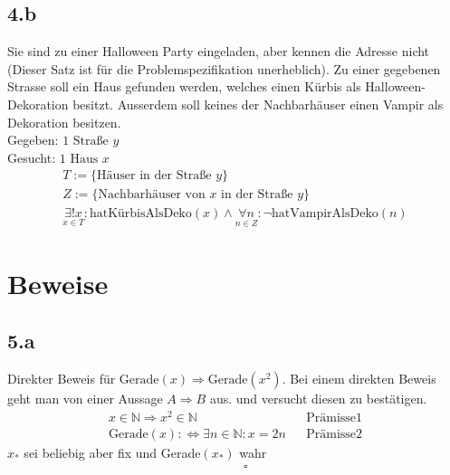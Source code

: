\documentclass[10pt,ngerman]{scrartcl}
\begin{document}
\subsection{4.b}
Sie sind zu einer Halloween Party eingeladen, aber kennen die Adresse nicht (Dieser
Satz ist für die Problemspezifikation unerheblich).
Zu einer gegebenen Strasse soll ein Haus gefunden werden, welches einen Kürbis
als Halloween-Dekoration besitzt. Ausserdem soll keines der Nachbarhäuser einen
Vampir als Dekoration besitzen.\vspace{0.5 cm}\\
Gegeben: $ 1 \text{ Straße } y$ \\%
Gesucht: $ 1 \text{ Haus } x$
\setcounter{equation}{0}
\begin{align}
T := \{\text{Häuser in der Straße }y\}\\
Z := \{\text{Nachbarhäuser von }x \text{ in der Straße }y\}\\
\underset{x \in T}{\exists! x} : \text{hatKürbisAlsDeko}(x) \wedge \underset{n \in Z}{\forall n} : \neg \text{hatVampirAlsDeko}(n)
\end{align}
\pagebreak
\section{Beweise}
\subsection{5.a}
Direkter Beweis für $\text{Gerade}(x) \Rightarrow \text{Gerade}(x^2)$. Bei einem direkten Beweis geht man von einer Aussage $A \Rightarrow B$ aus.  und versucht diesen zu bestätigen.
\setcounter{equation}{0}
\begin{align}
x \in \mathbb{N} \Rightarrow x^2 \in \mathbb{N} && \text{Prämisse} 1\\
\text{Gerade}(x): \Leftrightarrow \exists n \in \mathbb{N} : x = 2n && \text{Prämisse} 2
\end{align}
$x_*$ sei beliebig aber fix und Gerade$(x_*)$ wahr\\
\begin{align}
[\text{Gerade}(x_*) \Rightarrow \exists n \in \mathbb{N} : x_* = 2n && x_* \text{ in Prämisse } 2 \text{ einsetzten}\\
(x_*)^2 = (2n)^2 && x_* \text{quadriert}\\
x_*^2 = 4n^2 \\
x_*^2 = 2 * \underbrace{(2n^2)}_{n^2 \in \mathbb{N} \Rightarrow 2* n^2 \in \mathbb{N}; k := 2n^2}\\
x_*^2 = 2k \Rightarrow \text{Gerade}(x_*^2)] &&\square
\end{align}
\end{document}
